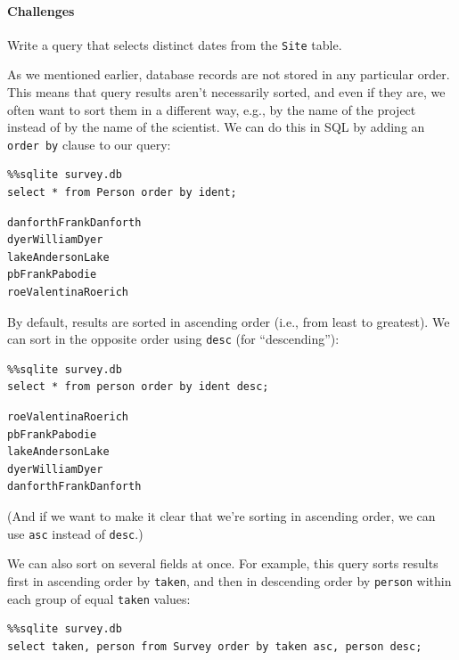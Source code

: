 \documentclass{book}
\begin{document}
\mbox{}\paragraph{Challenges}

\begin{swcenumerate}
\item
  Write a query that selects distinct dates from the \texttt{Site}
  table.
\end{swcenumerate}

As we mentioned earlier, database records are not stored in any
particular order. This means that query results aren't necessarily
sorted, and even if they are, we often want to sort them in a different
way, e.g., by the name of the project instead of by the name of the
scientist. We can do this in SQL by adding an \texttt{order by} clause
to our query:

\begin{verbatim}
%%sqlite survey.db
select * from Person order by ident;
\end{verbatim}

\begin{verbatim}
danforthFrankDanforth
dyerWilliamDyer
lakeAndersonLake
pbFrankPabodie
roeValentinaRoerich
\end{verbatim}

By default, results are sorted in ascending order (i.e., from least to
greatest). We can sort in the opposite order using \texttt{desc} (for
``descending''):

\begin{verbatim}
%%sqlite survey.db
select * from person order by ident desc;
\end{verbatim}

\begin{verbatim}
roeValentinaRoerich
pbFrankPabodie
lakeAndersonLake
dyerWilliamDyer
danforthFrankDanforth
\end{verbatim}

(And if we want to make it clear that we're sorting in ascending order,
we can use \texttt{asc} instead of \texttt{desc}.)

We can also sort on several fields at once. For example, this query
sorts results first in ascending order by \texttt{taken}, and then in
descending order by \texttt{person} within each group of equal
\texttt{taken} values:

\begin{verbatim}
%%sqlite survey.db
select taken, person from Survey order by taken asc, person desc;
\end{verbatim}
\end{document}
